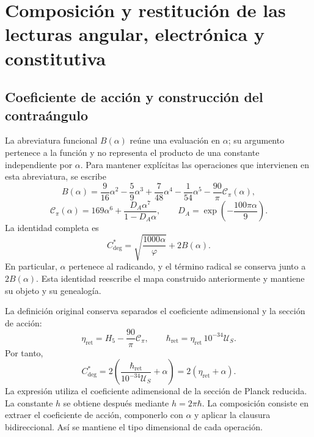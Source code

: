 \section{Composición y restitución de las lecturas angular, electrónica y constitutiva}
\label{md:compos:seccion}

\subsection{Coeficiente de acción y construcción del contraángulo}
\label{md:compos:contraangulo}

La abreviatura funcional $B(\alpha)$ reúne una evaluación en $\alpha$; su
argumento pertenece a la función y no representa el producto de una constante
independiente por $\alpha$. Para mantener explícitas las operaciones que
intervienen en esta abreviatura, se escribe
\begin{equation}
 B(\alpha)=\frac{9}{16}\alpha^2-\frac{5}{9}\alpha^3
 +\frac{7}{48}\alpha^4-\frac{1}{54}\alpha^5
 -\frac{90}{\pi}\mathcal C_\pi(\alpha),
 \label{md:compos:b-alpha}
\end{equation}
\begin{equation}
 \mathcal C_\pi(\alpha)=169\alpha^6+
 \frac{D_A\alpha^7}{1-D_A\alpha},
 \qquad D_A=\exp\!\left(-\frac{100\pi\alpha}{9}\right).
 \label{md:compos:correccion-regional}
\end{equation}
La identidad completa es
\begin{equation}
 C^*_{\deg}=\sqrt{\frac{1000\alpha}{\varphi}}+2B(\alpha).
 \label{md:compos:contraangulo-abreviado}
\end{equation}
En particular, $\alpha$ pertenece al radicando, y el término radical se
conserva junto a $2B(\alpha)$. Esta identidad reescribe el mapa construido
anteriormente y mantiene su objeto y su genealogía.

La definición original conserva separados el coeficiente adimensional y la
sección de acción:
\begin{equation}
 \eta_{\mathrm{ret}}=H_5-\frac{90}{\pi}\mathcal C_\pi,
 \qquad
 \hbar_{\mathrm{ret}}=\eta_{\mathrm{ret}}\,10^{-34}\mathcal U_S.
 \label{md:compos:seccion-accion}
\end{equation}
Por tanto,
\begin{equation}
 \boxed{C^*_{\deg}=2\left(
 \frac{\hbar_{\mathrm{ret}}}{10^{-34}\mathcal U_S}+\alpha\right)
 =2(\eta_{\mathrm{ret}}+\alpha).}
 \label{md:compos:contraangulo-accion}
\end{equation}
La expresión utiliza el coeficiente adimensional de la sección de Planck
reducida. La constante $h$ se obtiene después mediante $h=2\pi\hbar$.
La composición consiste en extraer el coeficiente de acción, componerlo con
$\alpha$ y aplicar la clausura bidireccional. Así se mantiene el tipo
dimensional de cada operación.

